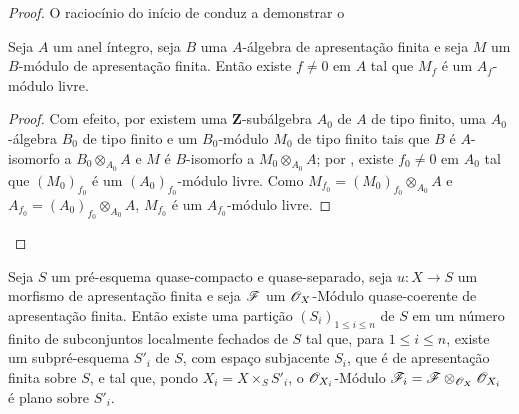 \begin{proof}
O raciocínio do início de  conduz a demonstrar o

\begin{lemma}[8.9.4.1]
\label{IV.8.9.4.1}
Seja $A$ um anel íntegro, seja $B$ uma $A$-álgebra de apresentação finita e seja $M$ um $B$-módulo de apresentação finita.
Então existe $f\neq 0$ em $A$ tal que $M_f$ é um $A_f$-módulo livre.
\end{lemma}

\begin{proof}
Com efeito, por  existem uma $\mathbf{Z}$-subálgebra $A_0$ de $A$ de tipo finito, uma $A_0$-álgebra $B_0$ de tipo finito e um $B_0$-módulo $M_0$ de tipo finito tais que $B$ é $A$-isomorfo a $B_0\otimes_{A_0}A$ e $M$ é $B$-isomorfo a $M_0\otimes_{A_0}A$; por , existe $f_0\neq 0$ em $A_0$ tal que $(M_0)_{f_0}$ é um $(A_0)_{f_0}$-módulo livre.
Como $M_{f_0}=(M_0)_{f_0}\otimes_{A_0}A$ e $A_{f_0}=(A_0)_{f_0}\otimes_{A_0}A$, $M_{f_0}$ é um $A_{f_0}$-módulo livre.
\end{proof}
\end{proof}

\begin{corollary}[8.9.5]
\label{IV.8.9.5}
Seja $S$ um pré-esquema quase-compacto e quase-separado, seja $u:X\to S$ um morfismo de apresentação finita e seja $\mathscr{F}$ um $\mathscr{O}_X$-Módulo quase-coerente de apresentação finita.
Então existe uma partição $(S_i)_{1\leqslant i\leqslant n}$ de $S$ em um número finito de subconjuntos localmente fechados de $S$ tal que, para $1\leqslant i\leqslant n$, existe um subpré-esquema $S'_i$ de $S$, com espaço subjacente $S_i$, que é de apresentação finita sobre $S$, e tal que, pondo $X_i=X\times_S S'_i$, o $\mathscr{O}_{X_i}$-Módulo $\mathscr{F}_i=\mathscr{F}\otimes_{\mathscr{O}_X}\mathscr{O}_{X_i}$ é plano sobre $S'_i$.
\end{corollary}


